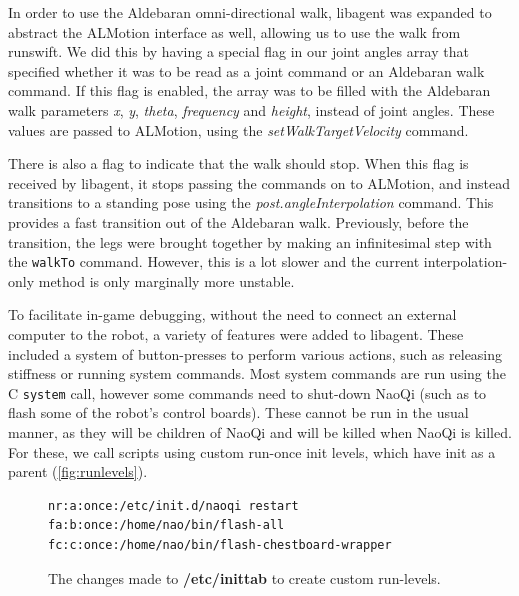 \documentclass[pdftex,11pt,a4paper]{report}
\begin{document}
In order to use the Aldebaran omni-directional walk, libagent was expanded
to abstract the ALMotion interface as well, allowing us to use the walk
from runswift. We did this by having a special flag in our joint angles
array that specified whether it was to be read as a joint command or an
Aldebaran walk command. If this flag is enabled, the array was to be filled
with the Aldebaran walk parameters \emph{x}, \emph{y}, \emph{theta},
\emph{frequency} and \emph{height}, instead of joint angles. These values
are passed to ALMotion, using the \emph{setWalkTargetVelocity} command.

There is also a flag to indicate that the walk should stop. When this flag
is received by libagent, it stops passing the commands on to ALMotion, and
instead transitions to a standing pose using the
\emph{post.angleInterpolation} command. This provides a fast transition out
of the Aldebaran walk. Previously, before the transition, the legs were
brought together by making an infinitesimal step with the \texttt{walkTo}
command. However, this is a lot slower and the current interpolation-only
method is only marginally more unstable.

To facilitate in-game debugging, without the need to connect an external
computer to the robot, a  variety of features were added to libagent. These
included a system of button-presses to perform various actions, such as
releasing stiffness or running system commands. Most system commands are
run using the C \texttt{system} call, however some commands need to
shut-down NaoQi (such as to flash some of the robot's control boards).
These cannot be run in the usual manner, as they will be children of NaoQi
and will be killed when NaoQi is killed. For these, we call scripts using
custom run-once init levels, which have init as a parent (\autoref{fig:runlevels}).

\begin{figure}
\begin{center}
   \begin{minipage}[h]{0.6\textwidth}
      \begin{verbatim}
nr:a:once:/etc/init.d/naoqi restart
fa:b:once:/home/nao/bin/flash-all
fc:c:once:/home/nao/bin/flash-chestboard-wrapper \end{verbatim}
   \end{minipage}
   \caption{The changes made to \textbf{/etc/inittab} to create custom run-levels.}
   \label{fig:runlevels}
\end{center}
\end{figure}
\end{document}
